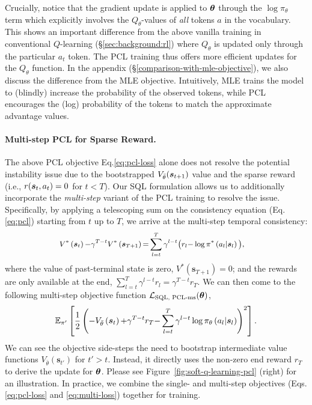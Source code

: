 Crucially, notice that the gradient update is applied to $\bm{\theta}$ through the $\log \pi_\theta$ term which explicitly involves the $Q_\theta$-values of \emph{all} tokens $a$ in the vocabulary. This shows an important difference from the above vanilla training in conventional $Q$-learning (\S\ref{sec:background:rl}) where $Q_\theta$ is updated only through the particular $a_t$ token. The PCL training thus offers more efficient updates for the $Q_\theta$ function.
In the appendix (\S\ref{comparison-with-mle-objective}), we also discuss the difference from the MLE objective. Intuitively, MLE trains the model to (blindly) increase the probability of the observed tokens, while PCL encourages the (log) probability of the tokens to match the approximate advantage values.



\paragraph{Multi-step PCL for Sparse Reward.} 
The above PCL objective Eq.\eqref{eq:pcl-loss} alone does not resolve the potential instability issue due to the bootstrapped $V_{\bar{{\theta}}}(\bm{s}_{t+1})$ value and the sparse reward (i.e., $r(\bm{s}_t, a_t)=0$ for $t<T$). 
Our SQL formulation allows us to additionally incorporate the \emph{multi-step} variant of the PCL training \citep{nachum2017bridging} to resolve the issue. Specifically, by applying a telescoping sum on the consistency equation (Eq.\ref{eq:pcl}) starting from $t$ up to $T$, we arrive at the multi-step temporal consistency:
\begin{equation}
\small
\begin{aligned}
    &V^{*}\left(\bm{s}_{t}\right){-}\gamma^{T-t} V^{*}\left(\bm{s}_{T+1}\right)
    {=} \sum_{l=t}^{T} \gamma^{l-t}\big(r_{l}{-}\log \pi^{*}\left(a_{l} | \bm{s}_{l}\right)\big),
\end{aligned}
\end{equation}
where the value of past-terminal state is zero, $V^*\left(\bm{s}_{T+1}\right) = 0$; and the rewards are only available at the end, $\sum_{l=t}^{T} \gamma^{l-t} r_{l} = \gamma^{T-t} r_{T}$. We can then come to the following multi-step objective function $\mathcal{L}_{\textrm{SQL, PCL-ms}}(\bm{\theta})$, 
\begin{equation}
\small
    \mathbb{E}_{\pi'} \left[\frac{1}{2}\left({-}V_{\bar{{\theta}}}\left(\bm{s}_{t}\right){+}\gamma^{T-t} r_{T}{-}\sum_{l=t}^{T} \gamma^{l-t} \log \pi_{{\theta}}\left(a_{l} | \bm{s}_{l}\right)\right)^{2}\right].
    \label{eq:multi-loss}
\end{equation}
We can see the objective side-steps the need to bootstrap intermediate value functions $V_{\bar{{\theta}}}(\bm{s}_{t'})$ for $t' > t$. Instead, it directly uses the non-zero end reward $r_T$ to derive the update for $\bm{\theta}$. Please see Figure~\ref{fig:soft-q-learning-pcl} (right) for an illustration. 
In practice, we combine the single- and multi-step objectives (Eqs.\ref{eq:pcl-loss} and \ref{eq:multi-loss}) together for training.

